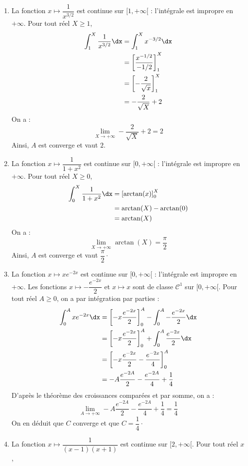 \documentclass[a4paper,10pt]{report}
\begin{document}
\begin{enumerate}
\item La fonction $x \mapsto  \dfrac{1}{x^{3/2}}$ est continue sur $[1, + \infty[$ : l'intégrale est impropre en $+ \infty$. Pour tout réel $X \geq 1$,
\begin{align*}
\int_1^X \dfrac{1}{x^{3/2}} \dx & = \int_1^X x^{-3/2} \dx  \\
& = \left[ \dfrac{x^{-1/2}}{-1/2} \right]_1^X \\
& = \left[ -\dfrac{2}{\sqrt{x}} \right]_1^X \\
& = - \dfrac{2}{\sqrt{X}} + 2
\end{align*}
On a :
$$ \lim_{X \rightarrow + \infty}  - \dfrac{2}{\sqrt{X}} + 2 = 2$$
Ainsi, $A$ est converge et vaut $2$.
\item La fonction $x \mapsto  \dfrac{1}{1+x^2}$ est continue sur $[0, + \infty[$ : l'intégrale est impropre en $+ \infty$. Pour tout réel $X \geq 0$,
\begin{align*}
\int_0^X \dfrac{1}{1+x^2} \dx & = \left[ \arctan(x) \right]_0^X \\
& =\arctan(X)- \arctan(0)\\
& = \arctan(X)
\end{align*}
On a :
$$ \lim_{X \rightarrow + \infty} \arctan(X) =  \dfrac{\pi}{2}$$
Ainsi, $A$ est converge et vaut $\dfrac{\pi}{2} \cdot$
\item La fonction $x \mapsto x e^{-2x}$ est continue sur $[0, + \infty[$ : l'intégrale est impropre en $+ \infty$. Les fonctions $x \mapsto -\dfrac{e^{-2x}}{2}$ et $x \mapsto x$ sont de classe $\mathcal{C}^1$ sur $[0, + \infty[$. Pour tout réel $A \geq 0$, on a par intégration par parties :
\begin{align*}
 \int_0^{A} x e^{-2x} \dx & = \left[ -x \dfrac{e^{-2x}}{2} \right]_0^A - \int_0^A -\dfrac{e^{-2x}}{2} \dx \\
 & = \left[ -x \dfrac{e^{-2x}}{2} \right]_0^A + \int_0^A \dfrac{e^{-2x}}{2} \dx \\
 & = \left[ -x \dfrac{e^{-2x}}{2} - \dfrac{e^{-2x}}{4}\right]_0^A \\
 & =  -A \dfrac{e^{-2A}}{2} - \dfrac{e^{-2A}}{4} + \dfrac{1}{4}
 \end{align*}
D'après le théorème des croissances comparées et par somme, on a :
$$ \lim_{A \rightarrow + \infty}  -A \dfrac{e^{-2A}}{2} - \dfrac{e^{-2A}}{4} + \dfrac{1}{4} = \dfrac{1}{4}$$
On en déduit que $C$ converge et que $C= \dfrac{1}{4} \cdot$
\item La fonction $x \mapsto \dfrac{1}{(x-1)(x+1)}$ est continue sur $[2, + \infty[$. Pour tout réel $x$,

\end{enumerate}
\end{document}
